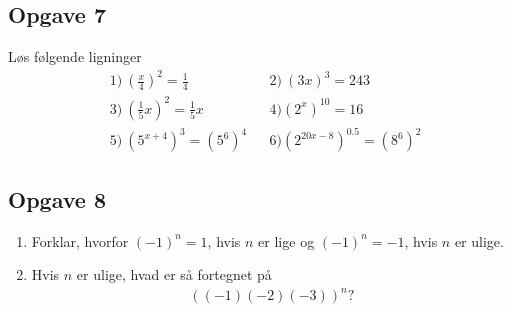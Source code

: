 \subsection*{Opgave 7}
Løs følgende ligninger
\begin{align*}
	&1) \ \left(\frac{x}{4}\right)^2 = \frac{1}{4} &   &2) \ (3x)^3 = 243 \\
	&3) \ \left(\frac{1}{5}x\right)^2 = \frac{1}{5}x & &4) \left(2^x\right)^{10} = 16 \\
	&5) \ \left(5^{x+4}\right)^3 = \left(5^6\right)^4  & &6) 
	\left(2^{20x-8}\right)^{0.5} = \left(8^6\right)^2
\end{align*}

\subsection*{Opgave 8}
\begin{enumerate}[label=\roman*)]
	\item Forklar, hvorfor $(-1)^n = 1$, hvis $n$ er lige og  $(-1)^n=-1$, hvis $n$ er ulige. 
	\item Hvis $n$ er ulige, hvad er så fortegnet på
	\begin{align*}
		((-1)(-2)(-3))^n?
	\end{align*}
\end{enumerate}
